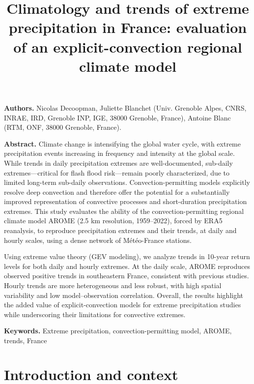 \documentclass[french,a4paper,DIV=11,numbers=noendperiod]{scrartcl}
\begin{document}
\title{Climatology and trends of extreme precipitation in France: evaluation of an explicit-convection regional climate model}
\author{}
\date{}
\maketitle


\textbf{Authors.}
Nicolas Decoopman, Juliette Blanchet (Univ. Grenoble Alpes, CNRS, INRAE,
IRD, Grenoble INP, IGE, 38000 Grenoble, France), Antoine Blanc (RTM,
ONF, 38000 Grenoble, France).

\textbf{Abstract.} Climate change is intensifying the global water cycle, with extreme precipitation events increasing in frequency and intensity at the global scale. While trends in daily precipitation extremes are well-documented, sub-daily extremes---critical for flash flood risk---remain poorly characterized, due to limited long-term sub-daily observations. Convection-permitting models explicitly resolve deep convection and therefore offer the potential for a substantially improved representation of convective processes and short-duration precipitation extremes. This study evaluates the ability of the convection-permitting regional climate model AROME (2.5 km resolution, 1959--2022), forced by ERA5 reanalysis, to reproduce precipitation extremes and their trends, at daily and hourly scales, using a dense network of Météo-France stations.

Using extreme value theory (GEV modeling), we analyze trends in 10-year return levels for both daily and hourly extremes. At the daily scale, AROME reproduces observed positive trends in southeastern France, consistent with previous studies. Hourly trends are more heterogeneous and less robust, with high spatial variability and low model–observation correlation. Overall, the results highlight the added value of explicit-convection models for extreme precipitation studies while underscoring their limitations for convective extremes.

\textbf{Keywords.} Extreme precipitation, convection-permitting model, AROME, trends, France

\section{Introduction and context}\label{introduction-and-context}
\end{document}
